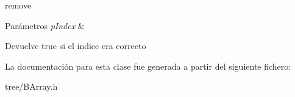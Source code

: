 remove 


\begin{DoxyParams}{Parámetros}
{\em p\-Index} & \\
\hline
\end{DoxyParams}
\begin{DoxyReturn}{Devuelve}
true si el indice era correcto 
\end{DoxyReturn}


La documentación para esta clase fue generada a partir del siguiente fichero\-:\begin{DoxyCompactItemize}
\item 
tree/B\-Array.\-h\end{DoxyCompactItemize}
